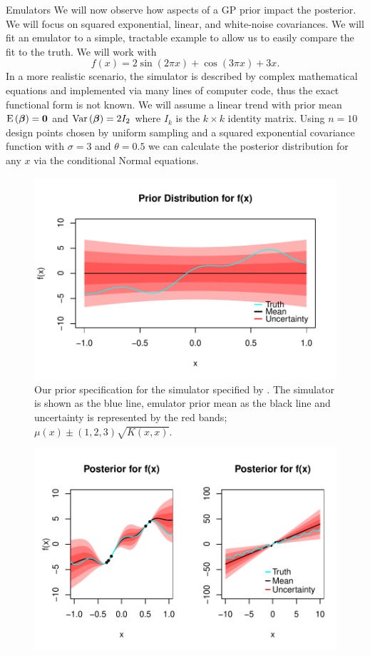 \begin{chapter}{Emulators \label{Ch:Emulators}}
 We will now observe how aspects of a GP prior impact the posterior. We will focus on squared exponential, linear, and white-noise covariances. We will fit an emulator to a simple, tractable example to allow us to easily compare the fit to the truth. We will work with
 \begin{equation}
   f(x) = 2 \sin (2 \pi x) + \cos(3\pi x) + 3x. \label{Eq:toy-fn}
 \end{equation}
In a more realistic scenario, the simulator is described by complex mathematical equations and implemented via many lines of computer code, thus the exact functional form is not known. We will assume a linear trend with prior mean $\textrm{E}\, (\bm{\beta}) = \bm{0}$ and $\mathrm{Var}\,(\bm{\beta}) = 2I_2$ where $I_k$ is the $k \times k$ identity matrix. Using $n = 10$ design points chosen by uniform sampling and a squared exponential covariance function with $\sigma = 3$ and $\theta = 0.5$ we can calculate the posterior distribution for any $x$ via the conditional Normal equations.
\begin{figure}[h]
  \centering
  \includegraphics{fig-emulators/prior.pdf}
  \caption{Our prior specification for the simulator specified by . The simulator is shown as the blue line, emulator prior mean as the black line and uncertainty is represented by the red bands; $\mu(x) \pm (1,2,3)\sqrt{K(x,x)}$.}
  \label{Fig:prior}
\end{figure}
\begin{figure}[h]
  \centering
  \includegraphics{fig-emulators/dual-posterior.pdf}

\end{figure}
\end{chapter}

